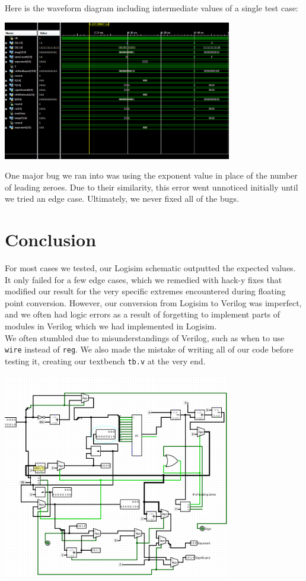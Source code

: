 \documentclass[]{article}
\begin{document}
Here is the waveform diagram including intermediate values of a single test case:

\includegraphics[width=10cm]{waveform.PNG}


One major bug we ran into was using the exponent value in place of the number of leading zeroes. Due to their similarity, this error went unnoticed initially until we tried an edge case. Ultimately, we never fixed all of the bugs.

\section{Conclusion}
For most cases we tested, our Logisim schematic outputted the expected values. It only failed for a few edge cases, which we remedied with hack-y fixes that modified our result for the very specific extremes encountered during floating point conversion. However, our conversion from Logisim to Verilog was imperfect, and we often had logic errors as a result of forgetting to implement parts of modules in Verilog which we had implemented in Logisim.\\

We often stumbled due to misunderstandings of Verilog, such as when to use \texttt{wire} instead of \texttt{reg}. We also made the mistake of writing all of our code before testing it, creating our textbench \texttt{tb.v} at the very end.

\includegraphics[width=10cm]{logisim.PNG}



\end{document}
